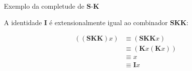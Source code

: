 \begin{frame}[fragile]{Exemplo da completude de $\mathbf{S}$-$\mathbf{K}$}

    A identidade $\mathbf{I}$ é extensionalmente igual ao combinador $\mathbf{S K K}$:

    \begin{align*}
        ((\mathbf{S K K}) x) &\equiv (\mathbf{S K K} x) \\
        & \equiv (\mathbf{K} x (\mathbf{K} x)) \\
        & \equiv x \\
        & \equiv \mathbf{I} x
    \end{align*}

\end{frame}

